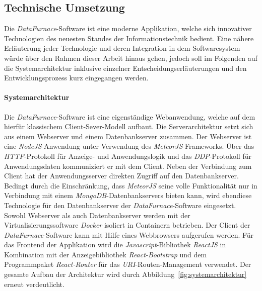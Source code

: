 \documentclass[
  language=german, %
  type=bachelor%
]{isthesis}
\begin{document}
\begin{content}
  \section{Technische Umsetzung}


  Die \textit{DataFurnace}-Software ist eine moderne Applikation, welche sich
  innovativer Technologien des neuesten Standes der Informationstechnik
  bedient. Eine nähere Erläuterung jeder Technologie und deren
  Integration in dem Softwaresystem würde über den Rahmen dieser Arbeit hinaus
  gehen, jedoch soll im Folgenden auf die Systemarchitektur inklusive
  einzelner Entscheidungserläuterungen und den Entwicklungsprozess kurz
  eingegangen werden.


  \paragraph{Systemarchitektur}
  Die \textit{DataFurnace}-Software ist eine eigenständige  Webanwendung,
  welche auf dem hierfür klassischem Client-Sever-Modell aufbaut. Die
  Serverarchitektur setzt sich aus einem Webserver und einem Datenbankserver
  zusammen. Der Webserver ist eine \textit{NodeJS}-Anwendung unter Verwendung
  des \textit{MeteorJS}-Frameworks. Über das \textit{HTTP}-Protokoll für
  Anzeige- und Anwendungslogik und das \textit{DDP}-Protokoll für
  Anwendungsdaten kommuniziert er mit dem Client. Neben der Verbindung zum
  Client hat der Anwendungsserver direkten Zugriff auf den Datenbankserver.
  Bedingt durch die Einschränkung, dass \textit{MeteorJS} seine volle
  Funktionalität nur in Verbindung mit einem \textit{MongoDB}-Datenbankservers
  bieten kann, wird ebendiese Technologie für den Datenbankserver der
  \textit{DataFurnace}-Software eingesetzt. Sowohl Webserver als auch
  Datenbankserver werden mit der Virtualisierungssoftware \textit{Docker}
  isoliert in Containern betrieben.  Der Client der
  \textit{DataFurnace}-Software kann mit Hilfe eines Webbrowsers aufgerufen
  werden. Für das Frontend der Applikation wird die
  \textit{Javascript}-Bibliothek \textit{ReactJS} in Kombination mit der
  Anzeigebibliothek \textit{React-Bootstrap} und dem Programmpaket
  \textit{React-Router} für das \textit{URI}-Routen-Management verwendet.  Der
  gesamte Aufbau der Architektur wird durch
  Abbildung~\ref{fig:systemarchitektur} erneut verdeutlicht.


\end{content}
\end{document}
